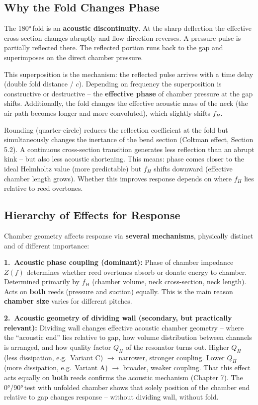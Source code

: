 \documentclass[11pt,a4paper]{article}
\begin{document}
\subsection{Why the Fold Changes Phase}

The 180°\,fold is an \textbf{acoustic discontinuity}. At the sharp deflection the effective cross-section changes abruptly and flow direction reverses. A pressure pulse is partially reflected there. The reflected portion runs back to the gap and superimposes on the direct chamber pressure.

This superposition is the mechanism: the reflected pulse arrives with a time delay (double fold distance / $c$). Depending on frequency the superposition is constructive or destructive -- the \textbf{effective phase} of chamber pressure at the gap shifts. Additionally, the fold changes the effective acoustic mass of the neck (the air path becomes longer and more convoluted), which slightly shifts $f_H$.

Rounding (quarter-circle) reduces the reflection coefficient at the fold but simultaneously changes the inertance of the bend section (Coltman effect, Section 5.2). A continuous cross-section transition generates less reflection than an abrupt kink -- but also less acoustic shortening. This means: phase comes closer to the ideal Helmholtz value (more predictable) but $f_H$ shifts downward (effective chamber length grows). Whether this improves response depends on where $f_H$ lies relative to reed overtones.

\subsection{Hierarchy of Effects for Response}

Chamber geometry affects response via \textbf{several mechanisms}, physically distinct and of different importance:

\textbf{1.\ Acoustic phase coupling (dominant):} Phase of chamber impedance $Z(f)$ determines whether reed overtones absorb or donate energy to chamber. Determined primarily by $f_H$ (chamber volume, neck cross-section, neck length). Acts on \textbf{both} reeds (pressure and suction) equally. This is the main reason \textbf{chamber size} varies for different pitches.

\textbf{2.\ Acoustic geometry of dividing wall (secondary, but practically relevant):} Dividing wall changes effective acoustic chamber geometry -- where the ``acoustic end'' lies relative to gap, how volume distribution between channels is arranged, and how quality factor $Q_H$ of the resonator turns out. Higher $Q_H$ (less dissipation, e.g.\ Variant C) $\to$ narrower, stronger coupling. Lower $Q_H$ (more dissipation, e.g.\ Variant A) $\to$ broader, weaker coupling. That this effect acts equally on \textbf{both} reeds confirms the acoustic mechanism (Chapter 7). The 0°/90°\,test with unfolded chamber shows that solely position of the chamber end relative to gap changes response -- without dividing wall, without fold.
\end{document}
